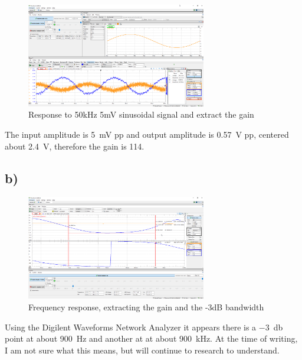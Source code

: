 \documentclass{article}
\begin{document}
	\begin{figure}[H]
	    \centering
	    \includegraphics[width=0.7\textwidth]{4a}
	    \caption{Response to 50kHz 5mV sinusoidal signal and extract the gain}
	\end{figure}
	
	The input amplitude is \SI{5}{\mV} pp and output amplitude is \SI{0.57}{\volt} pp, centered about \SI{2.4}{\volt}, therefore the gain is 114.
	
	\subsection*{b)}
	
	\begin{figure}[H]
	    \centering
	    \includegraphics[width=0.7\textwidth]{4b}
	    \caption{Frequency response, extracting the gain and the -3dB bandwidth}
	\end{figure}
	
	 Using the Digilent Waveforms Network Analyzer it appears there is a \SI{-3}{\decibel} point at about \SI{900}{\hertz} and another at at about \SI{900}{\kilo\hertz}. At the time of writing, I am not sure what this means, but will continue to research to understand.
	
	
	
		
\end{document}

